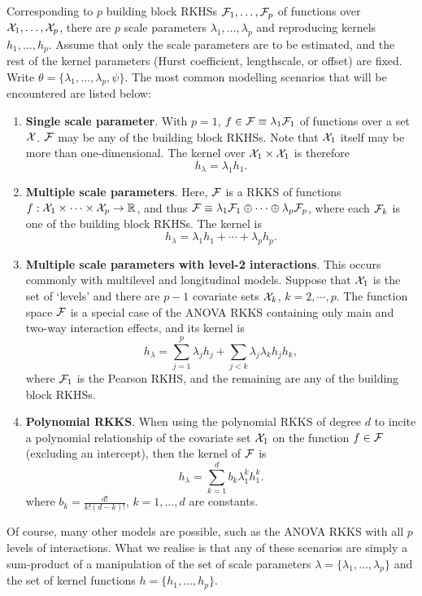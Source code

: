 Corresponding to $p$ building block RKHSs ${\mathcal F}_1,\dots,{\mathcal F}_p$ of functions over ${\mathcal X}_1,\dots,{\mathcal X}_p$, there are $p$ scale parameters $\lambda_1,\dots,\lambda_p$ and reproducing kernels $h_1,\dots,h_p$.
Assume that only the scale parameters are to be estimated, and the rest of the kernel parameters (Hurst coefficient, lengthscale, or offset) are fixed.
Write $\theta = \{\lambda_1,\dots,\lambda_p,\psi\}$.
The most common modelling scenarios that will be encountered are listed below:
\begin{enumerate}
  \item \textbf{Single scale parameter}. With $p=1$, $f\in{\mathcal F}\equiv \lambda_1{\mathcal F}_1$ of functions over a set ${\mathcal X}$. ${\mathcal F}$ may be any of the building block RKHSs. Note that ${\mathcal X}_1$ itself may be more than one-dimensional. The kernel over ${\mathcal X}_1\times{\mathcal X}_1$ is therefore
  \[
    h_\lambda = \lambda_1 h_1.
  \]
  \item \textbf{Multiple scale parameters}. Here, ${\mathcal F}$ is a RKKS of functions $f:{\mathcal X}_1\times\cdots\times{\mathcal X}_p\to\mathbb{R}$, and thus ${\mathcal F}\equiv \lambda_1{\mathcal F}_1 \oplus \cdots \oplus \lambda_p{\mathcal F}_p$, where each ${\mathcal F}_k$ is one of the building block RKHSs. The kernel is
  \[
    h_\lambda = \lambda_1 h_1 + \cdots + \lambda_p h_p.
  \]
  \item \textbf{Multiple scale parameters with level-2 interactions}. This occurs commonly with multilevel and longitudinal models. Suppose that ${\mathcal X}_1$ is the set of `levels' and there are $p-1$ covariate sets ${\mathcal X}_k$, $k=2,\cdots,p$. The function space ${\mathcal F}$ is a special case of the ANOVA RKKS containing only main and two-way interaction effects, and its kernel is
  \[
    h_\lambda = \sum_{j=1}^p \lambda_j h_j + \sum_{j < k} \lambda_j\lambda_k h_j h_k,
  \]
  where ${\mathcal F}_1$ is the Pearson RKHS, and the remaining are any of the building block RKHSs.
  \item \textbf{Polynomial RKKS}. When using the polynomial RKKS of degree $d$ to incite a polynomial relationship of the covariate set ${\mathcal X}_1$ on the function $f\in{\mathcal F}$ (excluding an intercept), then the kernel of ${\mathcal F}$ is
  \[
    h_\lambda = \sum_{k=1}^d b_k \lambda_1^k h_1^k.
  \]
  where $b_k = \frac{d!}{k!(d-k)!}$, $k=1,\dots,d$ are constants.
\end{enumerate}
Of course, many other models are possible, such as the ANOVA RKKS with all $p$ levels of interactions.
What we realise is that any of these scenarios are simply a sum-product of a manipulation of the set of scale parameters $\lambda = \{\lambda_1,\dots,\lambda_p\}$ and the set of kernel functions $h = \{h_1,\dots,h_p\}$.

